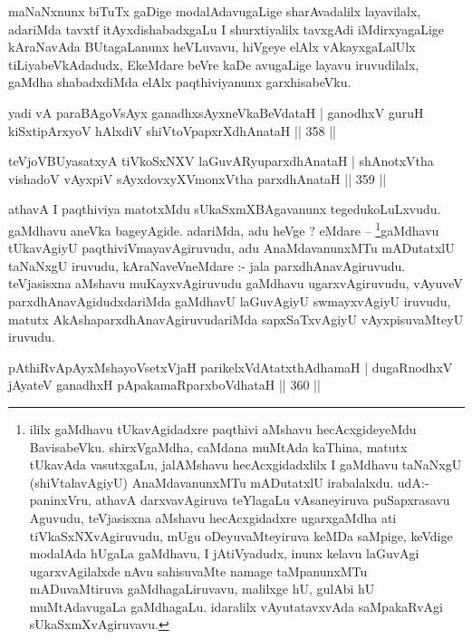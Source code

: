 \begin{artha}
maNaNxnunx biTuTx gaDige modalAdavugaLige sharAvadalilx layavilalx, adariMda tavxtf itAyxdishabadxgaLu I shurxtiyalilx tavxgAdi iMdirxyagaLige kAraNavAda BUtagaLanunx heVLuvavu, hiVgeye elAlx vAkayxgaLalUlx tiLiyabeVkAdadudx, EkeMdare beVre kaDe avugaLige layavu iruvudilalx, gaMdha shabadxdiMda elAlx paqthiviyanunx garxhisabeVku.
\end{artha}

\begin{shl}
yadi vA paraBAgoV\s sAyx ganadhxsAyxneVkaBeVdataH |
ganodhxV guruH kiSxtipArxyoV hAlxdiV shiVtoV\s papxrXdhAnataH \hfill || 358 ||
\end{shl}

\begin{shl}
teVjoVBUyasatxyA tiVkoSxNXV laGuvARyuparxdhAnataH |
shAnotxV\s tha vishadoV vAyxpiV sAyxdovxyXVmonxV\s tha parxdhAnataH \hfill || 359 ||
\end{shl}

\begin{artha}
athavA I paqthiviya matotxMdu sUkaSxmXBAgavanunx tegedukoLuLxvudu. \-gaMdhavu aneVka bageyAgide. adariMda, adu heVge ? eMdare -- \footnote[1]{ililx gaMdhavu tUkavAgidadxre paqthivi aMshavu hecAcxgideyeMdu BavisabeVku. shirxVgaMdha, caMdana muMtAda kaThina, matutx tUkavAda vasutxgaLu, jalAMshavu hecAcxgidadxlilx I gaMdhavu taNaNxgU (shiVtalavAgiyU) AnaMdavanunxMTu mADutatxlU irabalalxdu. udA:- paninxVru, athavA darxvavAgiruva teYlagaLu vAsaneyiruva puSapxrasavu Aguvudu, teVjasisxna aMshavu hecAcxgidadxre ugarxgaMdha ati tiVkaSxNXvAgiruvudu, mUgu oDeyuvaMteyiruva keMDa saMpige, keVdige modalAda hUgaLa gaMdhavu, I jAtiVyadudx, inunx kelavu laGuvAgi ugarxvAgilalxde nAvu sahisuvaMte namage taMpanunxMTu mADuvaMtiruva gaMdhagaLiruvavu, malilxge hU, gulAbi hU muMtAdavugaLa gaMdhagaLu. idaralilx vAyutatavxvAda saMpakaRvAgi sUkaSxmXvAgiruvavu.}gaMdhavu tUka\-vAgiyU paqthiviVmayavAgiruvudu, adu AnaMdavanunxMTu mADutatxlU taNaNxgU iru\-vudu, kAraNaveVneMdare :- jala parxdhAnavAgiruvudu. teVjasisxna aMshavu muKayx\-vAgiruvudu gaMdhavu ugarxvAgiruvudu, vAyuveV parxdhAnavAgidudxdariMda gaMdha\-vU laGuvAgiyU swmayxvAgiyU iruvudu, matutx AkAshaparxdhAnavAgiruvuda\-riMda sapxSaTxvAgiyU vAyxpisuvaMteyU iruvudu.
\end{artha}


\begin{shl}
pAthiRvApAyxMshayoVsetxVjaH parikelxVdAtatxthA\s dhamaH |
dugaRnodhxV jAyateV ganadhxH pApakamaRparxboVdhataH \hfill || 360 ||
\end{shl}

